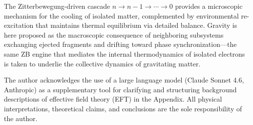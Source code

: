 \documentclass[%
 reprint, amsmath,amssymb, aps, prb, ]{revtex4-2}
\numberwithin{equation}{section}
\begin{document}
The Zitterbewegung-driven cascade $n \to n-1 \to \cdots \to 0$ provides a microscopic mechanism for the cooling of isolated matter, complemented by environmental re-excitation that maintains thermal equilibrium via detailed balance. Gravity is here proposed as the macroscopic consequence of neighboring subsystems exchanging ejected fragments and drifting toward phase synchronization---the same ZB engine that mediates the internal thermodynamics of isolated electrons is taken to underlie the collective dynamics of gravitating matter.

\begin{acknowledgments}
The author acknowledges the use of a large language model (Claude Sonnet 4.6, Anthropic) as a supplementary tool for clarifying and structuring background descriptions of effective field theory (EFT) in the Appendix.
All physical interpretations, theoretical claims, and conclusions are the sole responsibility of the author.
\end{acknowledgments}
\end{document}
